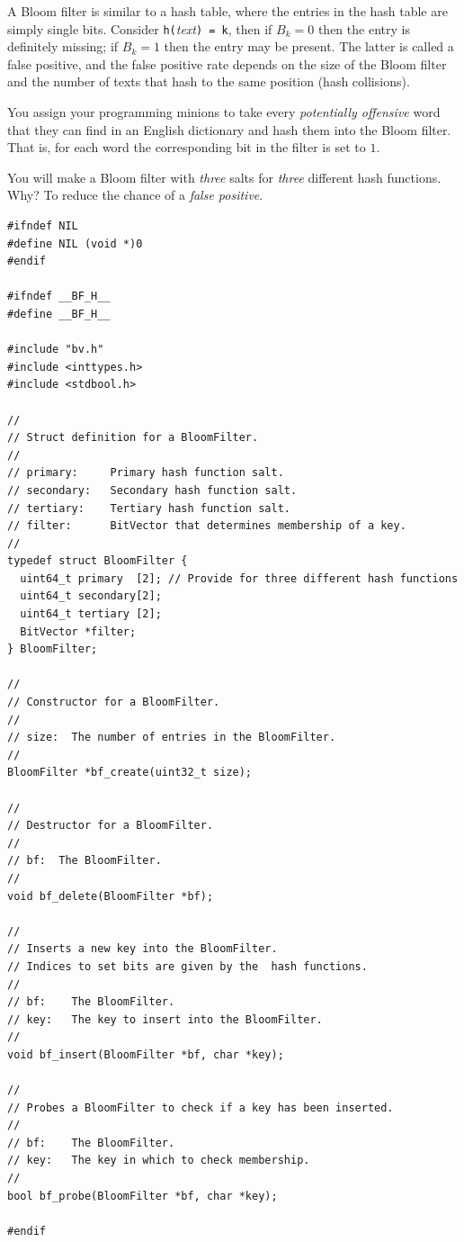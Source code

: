 \documentclass{article}
\begin{document}
A Bloom filter is similar to a hash table, where the entries in the hash table are simply
single bits.  Consider \texttt{h(}\emph{text}\texttt{) = k}, then if $B_k = 0$
then the entry is definitely missing; if $B_k = 1$ then the entry may be
present. The latter is called a false positive, and the false positive rate
depends on the size of the Bloom filter and the number of texts that hash to the
same position (hash collisions).

You assign your programming minions to take every \emph{potentially offensive}
word that they can find in an English dictionary and hash them into the Bloom
filter. That is, for each word the corresponding bit in the filter is set to
$1$.

You will make a Bloom filter with \emph{three} salts for \emph{three} different
hash functions. Why? To reduce the chance of a \emph{false positive}.

\lstset{language=C, style=c99}
\begin{lstlisting}[title=bf.h]
#ifndef NIL
#define NIL (void *)0
#endif

#ifndef __BF_H__
#define __BF_H__

#include "bv.h"
#include <inttypes.h>
#include <stdbool.h>

//
// Struct definition for a BloomFilter.
//
// primary:     Primary hash function salt.
// secondary:   Secondary hash function salt.
// tertiary:    Tertiary hash function salt.
// filter:      BitVector that determines membership of a key.
//
typedef struct BloomFilter {
  uint64_t primary  [2]; // Provide for three different hash functions
  uint64_t secondary[2];
  uint64_t tertiary [2];
  BitVector *filter;
} BloomFilter;

//
// Constructor for a BloomFilter.
//
// size:  The number of entries in the BloomFilter.
//
BloomFilter *bf_create(uint32_t size);

//
// Destructor for a BloomFilter.
//
// bf:  The BloomFilter.
//
void bf_delete(BloomFilter *bf);

//
// Inserts a new key into the BloomFilter.
// Indices to set bits are given by the  hash functions.
//
// bf:    The BloomFilter.
// key:   The key to insert into the BloomFilter.
//
void bf_insert(BloomFilter *bf, char *key);

//
// Probes a BloomFilter to check if a key has been inserted.
//
// bf:    The BloomFilter.
// key:   The key in which to check membership.
//
bool bf_probe(BloomFilter *bf, char *key);

#endif
\end{lstlisting}
\end{document}
